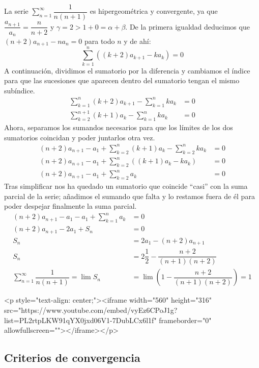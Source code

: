 \begin{ejemplo}\label{ej:hipergeom}
La serie $\displaystyle\sum_{n=1}^\infty  \dfrac{1}{n(n+1)}$ es hipergeométrica y convergente, ya que
$\dfrac{a_{n+1}}{a_n}=\dfrac{n}{n+2}$ y $\gamma=2>1+0=\alpha+\beta$.
De la primera igualdad deducimos que $(n+2)a_{n+1}-n a_n=0$ para todo $n$ y de ahí:
\[
\sum_{k=1}^n((k+2)a_{k+1}- k a_k)=0
\]
A continuación, dividimos el sumatorio por la diferencia y cambiamos el índice para que las sucesiones que aparecen dentro del sumatorio tengan el mismo subíndice.
\begin{align*}
\sum_{k=1}^n(k+2)a_{k+1}-\sum_{k=1}^n k a_k&=0 \\
\sum_{k=2}^{n+1}(k+1)a_{k}-\sum_{k=1}^n k a_k&=0
\end{align*}
Ahora, separamos los sumandos necesarios para que los límites de los dos sumatorios coincidan y poder juntarlos otra vez.
\begin{align*}
(n+2)a_{n+1}-a_1+\sum_{k=2}^{n}(k+1)a_{k}-\sum_{k=2}^n k a_k&=0 \\
(n+2)a_{n+1}-a_1+\sum_{k=2}^{n}((k+1)a_{k}- k a_k)&=0 \\
(n+2)a_{n+1}-a_1+\sum_{k=2}^{n}a_k&=0
\end{align*}
Tras simplificar nos ha quedado un sumatorio que coincide ``casi'' con la suma parcial de la serie; añadimos el sumando que falta y lo restamos fuera de él para poder despejar finalmente la suma parcial.
\begin{align*}
(n+2)a_{n+1}-a_1-a_1+\sum_{k=1}^{n}a_k&=0 \\
(n+2)a_{n+1}-2a_1+S_n&=0 \\
S_n&=2a_1-(n+2)a_{n+1}\\
S_n &= 2\dfrac12 - \dfrac{n+2}{(n+1)(n+2)} \\
\displaystyle\sum_{n=1}^\infty  \dfrac{1}{n(n+1)} = \lim S_n & = \lim\left(1 - \dfrac{n+2}{(n+1)(n+2)}\right) = 1\tag*{\fej}
\end{align*}
\end{ejemplo}

\begin{rawhtml}
<p style="text-align: center;"><iframe width="560" height="316" src="https://www.youtube.com/embed/vyEz6CPoJ1g?list=PL2rtpLKW91qYX0jxd06V1-7DubLCx6l1f" frameborder="0" allowfullscreen=""></iframe></p>
\end{rawhtml}

\subsection{Criterios de convergencia}

